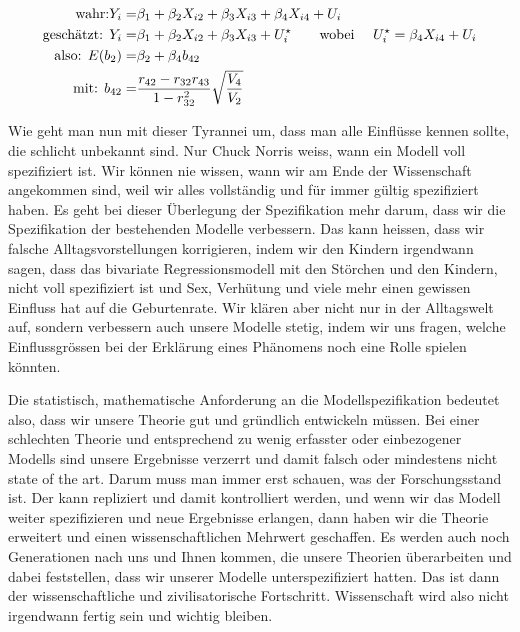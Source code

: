\documentclass[
  10pt,
  letterpaper,
  a4paper, twoside]{scrreprt}
\begin{document}
\begin{align}
  \text{wahr:} Y_i=&\beta_1 + \beta_2X_{i2} + \beta_3X_{i3} + \beta_4X_{i4}+U_i \label{eq-3.81} \\
  \text{geschätzt: } Y_i=&\beta_1 + \beta_2X_{i2} + \beta_3X_{i3}
                          +U^\star_i \text{\qquad wobei \quad } U^\star_i = \beta_4X_{i4}+U_i \label{eq-3.82}\\
  \text{also: } E(b_2) =& \beta_2 + \beta_4b_{42} \label{eq-3.83}\\
  \text{mit: }
  b_{42}=&\frac{r_{42}-r_{32}r_{43}}{1-r^2_{32}}\sqrt{\frac{V_4}{V_2}} \label{eq-3.84}
\end{align}

Wie geht man nun mit dieser Tyrannei um, dass man alle Einflüsse kennen
sollte, die schlicht unbekannt sind. Nur Chuck Norris weiss, wann ein
Modell voll spezifiziert ist. Wir können nie wissen, wann wir am Ende
der Wissenschaft angekommen sind, weil wir alles vollständig und für
immer gültig spezifiziert haben. Es geht bei dieser Überlegung der
Spezifikation mehr darum, dass wir die Spezifikation der bestehenden
Modelle verbessern. Das kann heissen, dass wir falsche
Alltagsvorstellungen korrigieren, indem wir den Kindern irgendwann
sagen, dass das bivariate Regressionsmodell mit den Störchen und den
Kindern, nicht voll spezifiziert ist und Sex, Verhütung und viele mehr
einen gewissen Einfluss hat auf die Geburtenrate. Wir klären aber nicht
nur in der Alltagswelt auf, sondern verbessern auch unsere Modelle
stetig, indem wir uns fragen, welche Einflussgrössen bei der Erklärung
eines Phänomens noch eine Rolle spielen könnten.

Die statistisch, mathematische Anforderung an die Modellspezifikation
bedeutet also, dass wir unsere Theorie gut und gründlich entwickeln
müssen. Bei einer schlechten Theorie und entsprechend zu wenig erfasster
oder einbezogener Modells sind unsere Ergebnisse verzerrt und damit
falsch oder mindestens nicht state of the art. Darum muss man immer erst
schauen, was der Forschungsstand ist. Der kann repliziert und damit
kontrolliert werden, und wenn wir das Modell weiter spezifizieren und
neue Ergebnisse erlangen, dann haben wir die Theorie erweitert und einen
wissenschaftlichen Mehrwert geschaffen. Es werden auch noch Generationen
nach uns und Ihnen kommen, die unsere Theorien überarbeiten und dabei
feststellen, dass wir unserer Modelle unterspezifiziert hatten. Das ist
dann der wissenschaftliche und zivilisatorische Fortschritt.
Wissenschaft wird also nicht irgendwann fertig sein und wichtig bleiben.
\end{document}
